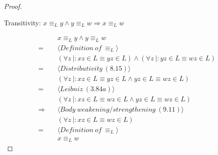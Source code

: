 \documentclass[11pt]{article}
\newenvironment{problem}[2][Problem]{\begin{trivlist}
\item[\hskip \labelsep {\bfseries #1}\hskip \labelsep {\bfseries #2.}]}{\end{trivlist}}
\begin{document}
\begin{proof}
\begin{problem}[Part]{3}
Transitivity: $x \equiv_{L} y \wedge y \equiv_{L} w \Rightarrow x \equiv_{L} w$
\end{problem}
\begin{align*}
&\quad x \equiv_{L} y \wedge y \equiv_{L} w \\
= &\quad \langle Definition \ of \ \equiv_{L} \rangle \\
&\quad (\forall z \ |: xz \in L \equiv yz \in L) \wedge (\forall z \ |: yz \in L \equiv wz \in L) \\
= &\quad \langle Distributivity \ (8.15) \rangle \\
&\quad (\forall z \ |: xz \in L \equiv yz \in L \wedge yz \in L \equiv wz \in L) \\
= &\quad \langle Leibniz \ (3.84 a) \rangle \\
&\quad (\forall z \ |: xz \in L \equiv wz \in L \wedge yz \in L \equiv wz \in L) \\
\Rightarrow &\quad \langle Body \ weakening/strengthening \ (9.11) \rangle \\
&\quad (\forall z \ |: xz \in L \equiv wz \in L) \\
= &\quad \langle Definition \ of \ \equiv_{L} \rangle \\
&\quad x \equiv_{L} w
\end{align*}
\end{proof}
\end{document}
